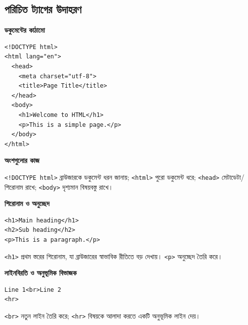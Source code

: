 \subsection{পরিচিত ট্যাগের উদাহরণ}
\par\noindent
\begin{minipage}[t]{.52\linewidth}\vspace{0pt}\small
{\bfseries\color{chFourTeal}ডকুমেন্টের কাঠামো}\par
\begin{verbatim}
<!DOCTYPE html>
<html lang="en">
  <head>
    <meta charset="utf-8">
    <title>Page Title</title>
  </head>
  <body>
    <h1>Welcome to HTML</h1>
    <p>This is a simple page.</p>
  </body>
</html>
\end{verbatim}
\end{minipage}\hfill
\begin{minipage}[t]{.44\linewidth}\vspace{0pt}\small
{\bfseries\color{chFourTeal}অংশগুলোর কাজ}\par
\texttt{<!DOCTYPE html>} ব্রাউজারকে ডকুমেন্ট ধরন জানায়; \texttt{<html>} পুরো ডকুমেন্ট ধরে; \texttt{<head>} মেটাডেটা/শিরোনাম রাখে; \texttt{<body>} দৃশ্যমান বিষয়বস্তু রাখে।
\end{minipage}\par\smallskip
\par\noindent
\begin{minipage}[t]{.48\linewidth}\vspace{0pt}\small
{\bfseries\color{chFourTeal}শিরোনাম ও অনুচ্ছেদ}\par
\begin{verbatim}
<h1>Main heading</h1>
<h2>Sub heading</h2>
<p>This is a paragraph.</p>
\end{verbatim}
\texttt{<h1>} প্রথম স্তরের শিরোনাম, যা ব্রাউজারের স্বাভাবিক রীতিতে বড় দেখায়। \texttt{<p>} অনুচ্ছেদ তৈরি করে।
\end{minipage}\hfill
\begin{minipage}[t]{.48\linewidth}\vspace{0pt}\small
{\bfseries\color{chFourTeal}লাইনবিরতি ও অনুভূমিক বিভাজক}\par
\begin{verbatim}
Line 1<br>Line 2
<hr>
\end{verbatim}
\texttt{<br>} নতুন লাইন তৈরি করে; \texttt{<hr>} বিষয়কে আলাদা করতে একটি অনুভূমিক লাইন দেয়।
\end{minipage}\par\smallskip
